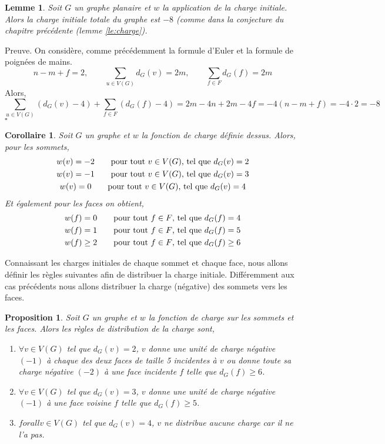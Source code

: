 \documentclass[10pt,a4paper]{article}
\newtheorem{proposition}{Proposition}
\newtheorem{lemme}{Lemme}
\newtheorem{corollaire}{Corollaire}
\newcommand{\ep}{{\hfill $\square$}}
\begin{document}
\begin{lemme}
Soit $G$ un graphe planaire et $w$ la application de la charge initiale. Alors la charge initiale totale du graphe est $-8$ (comme dans la conjecture du chapitre précédente (lemme \ref{le:charge}).
\end{lemme}

Preuve.
On considère, comme précédemment la formule d'Euler et la formule de poignées de mains.
$$
n - m + f = 2, \qquad \sum_{u \in V(G)} d_G(v) = 2m, \qquad \sum_{f \in F} d_G(f) = 2m
$$
Alors,
$$
\sum_{u \in V(G)} (d_G(v) - 4) + \sum_{f \in F} (d_G(f) - 4) = 2m - 4n + 2m - 4f = -4( n - m + f) = -4 \cdot 2 = -8
$$
\ep

\begin{corollaire}
Soit $G$ un graphe et $w$ la fonction de charge définie dessus. Alors, pour les sommets,
$$
\gathered
w(v) = -2 \qquad \textrm{pour tout $v \in V(G)$, tel que  } d_G(v) = 2\\
w(v) = -1 \qquad \textrm{pour tout $v \in V(G)$, tel que  } d_G(v) = 3\\
w(v) = 0 \qquad \textrm{pour tout $v \in V(G)$, tel que  } d_G(v) = 4
\endgathered
$$
Et également pour les faces on obtient,
$$
\gathered
w(f) = 0 \qquad \textrm{pour tout $f \in F$, tel que  } d_G(f) = 4\\
w(f) = 1 \qquad \textrm{pour tout $f \in F$, tel que  } d_G(f) = 5\\
w(f) \geq 2 \qquad \textrm{pour tout $f \in F$, tel que  } d_G(f) \geq 6
\endgathered
$$
\end{corollaire}

Connaissant les charges initiales de chaque sommet et chaque face, nous allons définir les règles suivantes afin de distribuer la charge initiale. Différemment aux cas précédents nous allons distribuer la charge (négative) des sommets vers les faces.

\begin{proposition}
Soit $G$ un graphe et $w$ la fonction de charge sur les sommets et les faces. Alors les règles de distribution de la charge sont,

\begin{enumerate}
\item [(R1)] $\forall v \in V(G)$ tel que $d_G(v) = 2$, $v$ donne une unité de charge négative $(-1)$ à chaque des deux faces de taille 5 incidentes à $v$ ou donne toute sa charge négative $(-2)$ à une face incidente $f$ telle que $d_G(f) \geq 6$.
\item [(R2)] $\forall v \in V(G)$ tel que $d_G(v) = 3$, $v$ donne une unité de charge négative $(-1)$ à une face voisine $f$ telle que $d_G(f) \geq 5$.
\item [(R3)] $forall v \in V(G)$ tel que $d_G(v) = 4$, $v$ ne distribue aucune charge car il ne l'a pas.
\end{enumerate}
\end{proposition}
\end{document}
